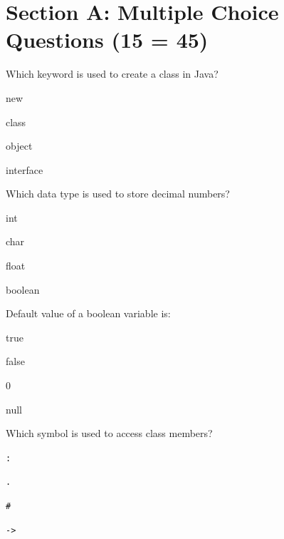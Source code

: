 \documentclass{CWNUExam}
\begin{document}
\maketitle

\section{Section A: Multiple Choice Questions (15  = 45)}

\begin{question}
Which keyword is used to create a class in Java?
\paren
\begin{choices}
\item new
\item class
\item object
\item interface
\end{choices}
\end{question}

\begin{question}
Which data type is used to store decimal numbers?
\paren
\begin{choices}
\item int
\item char
\item float
\item boolean
\end{choices}
\end{question}

\begin{question}
Default value of a boolean variable is:
\paren
\begin{choices}
\item true
\item false
\item 0
\item null
\end{choices}
\end{question}

\begin{question}
Which symbol is used to access class members?
\paren
\begin{choices}
\item \texttt{:}
\item \texttt{.}
\item \texttt{\#} %
\item \texttt{->}
\end{choices}
\end{question}
\end{document}

